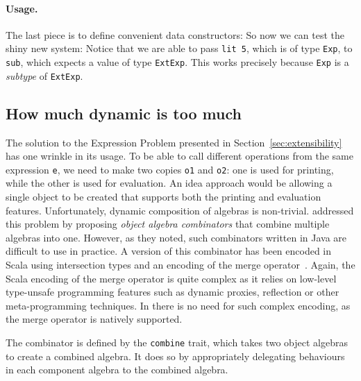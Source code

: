 \paragraph{Usage.} The last piece is to define convenient data constructors:
So now we can test the shiny new system:
Notice that we are able to pass \lstinline{lit 5}, which is of type
\lstinline{Exp}, to \lstinline{sub}, which expects a value of type
\lstinline{ExtExp}. This works precisely because \lstinline{Exp} is a
\textit{subtype} of \lstinline{ExtExp}.



\subsection{How much dynamic is too much}
\label{sec:dynamic}



The solution to the Expression Problem presented in
Section~\ref{sec:extensibility} has one wrinkle in its usage. To be able to call
different operations from the same expression \lstinline{e}, we need to make two
copies \lstinline{o1} and \lstinline{o2}: one is used for printing, while the
other is used for evaluation. An idea approach would be allowing a single object
to be created that supports both the printing and evaluation features.
Unfortunately, dynamic composition of algebras is non-trivial.
\citet{oliveira2012extensibility} addressed this problem by proposing
\textit{object algebra combinators} that combine multiple algebras into one.
However, as they noted, such combinators written in Java are difficult to use in
practice. A version of this combinator has been encoded in Scala using
intersection types and an encoding of the merge
operator~\cite{oliveira2013feature, rendel14attributes}. Again, the Scala
encoding of the merge operator is quite complex as it relies on low-level
type-unsafe programming features such as dynamic proxies, reflection or other
meta-programming techniques. In \name there is no need for such complex
encoding, as the merge operator is natively supported.

The combinator is defined by the \lstinline{combine} trait, which takes two
object algebras to create a combined algebra. It does so by appropriately
delegating behaviours in each component algebra to the combined algebra.

